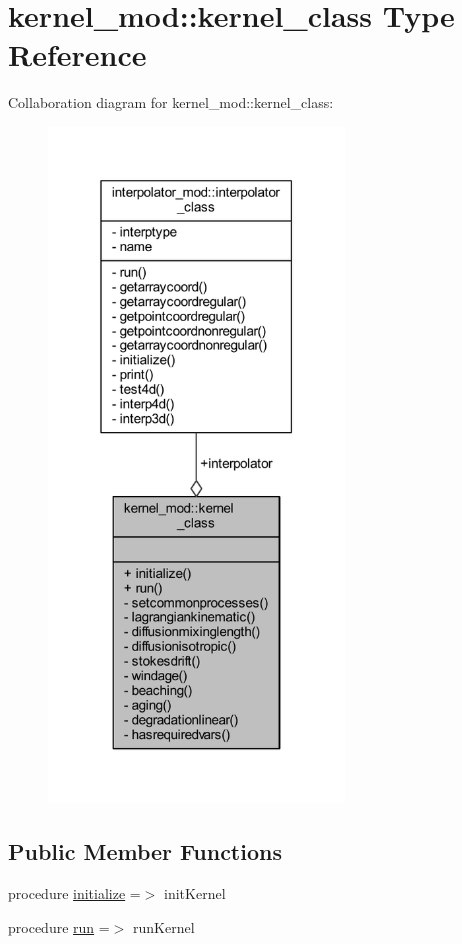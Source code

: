 \hypertarget{structkernel__mod_1_1kernel__class}{}\section{kernel\+\_\+mod\+:\+:kernel\+\_\+class Type Reference}
\label{structkernel__mod_1_1kernel__class}


Collaboration diagram for kernel\+\_\+mod\+:\+:kernel\+\_\+class\+:\nopagebreak
\begin{figure}[H]
\begin{center}
\leavevmode
\includegraphics[width=223pt]{structkernel__mod_1_1kernel__class__coll__graph}
\end{center}
\end{figure}
\subsection*{Public Member Functions}
\begin{DoxyCompactItemize}
\item 
procedure \mbox{\hyperlink{structkernel__mod_1_1kernel__class_a86a1de717f53f3276df28443b4495cc7}{initialize}} =$>$ init\+Kernel
\item 
procedure \mbox{\hyperlink{structkernel__mod_1_1kernel__class_aa84d6f7ea89eb403e61aed2a0234288c}{run}} =$>$ run\+Kernel
\end{DoxyCompactItemize}
